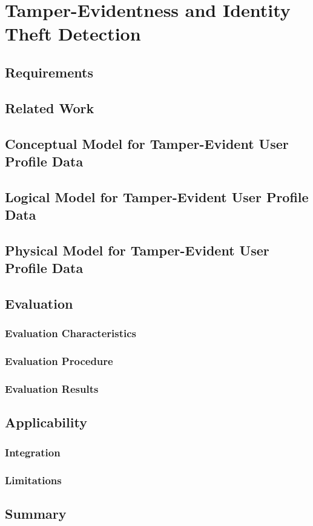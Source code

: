 \chapter{Tamper-Evidentness and Identity Theft Detection}
\label{chap:componentIntegrity}

\section{Requirements}

\section{Related Work}


\section{Conceptual Model for Tamper-Evident User Profile Data}

\section{Logical Model for Tamper-Evident User Profile Data}

\section{Physical Model for Tamper-Evident User Profile Data}

\section{Evaluation}


\subsection{Evaluation Characteristics}
\subsection{Evaluation Procedure}
\subsection{Evaluation Results}


\section{Applicability}

\subsection{Integration}

\subsection{Limitations}

\section{Summary}
